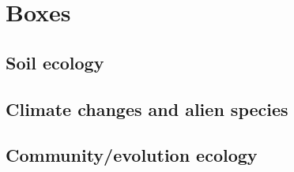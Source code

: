 

\section{Boxes}\label{potential-boxes}

\subsection{Soil ecology}\label{soil-ecology}

\subsection{Climate changes and alien
species}\label{climate-changes-and-alien-species}

\subsection{Community/evolution ecology}\label{communityevolution-ecology}






